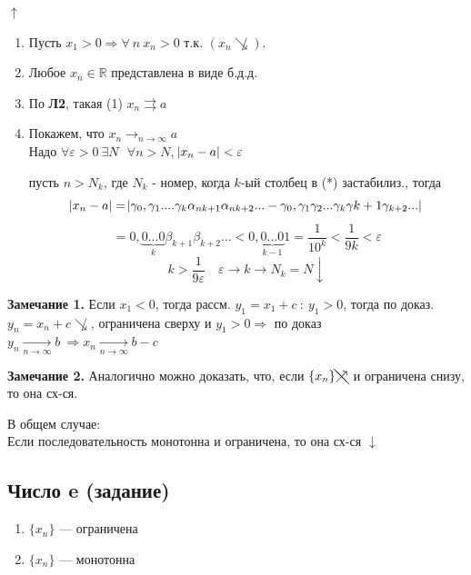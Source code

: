 \documentclass{article}
\begin{document}
    \(\uparrow\)
    \begin{enumerate}
        \item Пусть \( x_1 > 0 \Rightarrow \forall\ n\ x_n > 0 \) т.к. \( (x_n \not\searrow ) \).

        \item Любое \( x_n \in \mathbb{R} \) представлена в виде б.д.д.

        \item По \textbf{Л2}, такая (1) \( x_n \rightrightarrows a \)

        \item Покажем, что \(x_n \longrightarrow_{n \rightarrow \infty} a\)
    \\ Надо \(\forall \varepsilon > 0 \ \exists N \ \: \ \forall n > N\), \(\abs{x_n - a} < \varepsilon\)

    пусть \( n > N_k \), где \( N_k \) - номер, когда \(k\)-ый столбец в (*) застабилиз., тогда 
    \[ \abs{x_n - a} = \abs{\gamma_0,\gamma_1....\gamma_k\alpha_{nk+1}\alpha_{nk+2}... - \gamma_0,\gamma_1\gamma_2...\gamma_k\gamma{k+1}\gamma_{k+2}...} \]
    \[ = 0,\underbrace{0...0}_k\beta_{k+1}\beta_{k+2}... < 0,\underbrace{0...0}_{k-1}1 = \frac{1}{10^k} < \frac{1}{9k} < \varepsilon \]
    \[k > \frac{1}{9\varepsilon}\quad \varepsilon \rightarrow k \rightarrow N_k = N \downarrow \]
    \end{enumerate}

    \textbf{Замечание 1.} 
    Если \(x_1 < 0\), тогда рассм. \(y_1 = x_1 + c\ : \ y_1 > 0\), тогда по доказ. \( y_n = x_n + c \not\searrow \), ограничена сверху и \( y_1 > 0 \Rightarrow \) по доказ \(y_n \xrightarrow[n \rightarrow \infty]{} b\ \Rightarrow x_n \xrightarrow[n \rightarrow \infty]{} b - c\)
    
    \textbf{Замечание 2.}
    Аналогично можно доказать, что, если \(\{x_n\} \bcancel{\nearrow}\) и ограничена снизу, то она сх-ся.
    
    В общем случае:
    \\ Если последовательность монотонна и ограничена, то она сх-ся \(\downarrow\)
    
    \subsection{Число e (задание)}
    
    \begin{enumerate}
    	\item \( \{ x_n \} \) --- ограничена
    	\item \( \{ x_n \} \) --- монотонна
    \end{enumerate}
    
\end{document}
